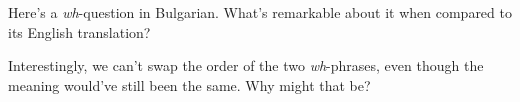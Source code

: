 \documentclass{article}
\begin{document}
Here's a \emph{wh}-question in Bulgarian. What's remarkable about it when compared to its English translation?
\z

Interestingly, we can't swap the order of the two \emph{wh}-phrases, even though the meaning would've still been the same. Why might that be?
\z
\end{document}
